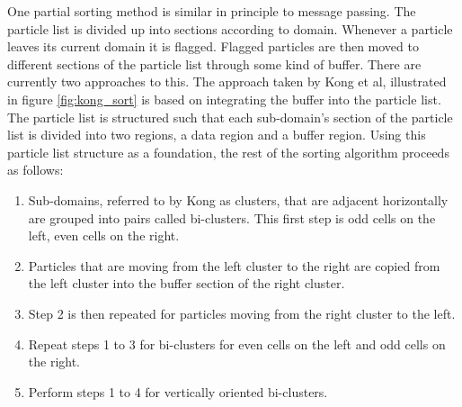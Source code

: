 	One partial sorting method is similar in principle to message passing. The particle list is divided up into sections according to domain. Whenever a particle leaves its current domain it is flagged. Flagged particles are then moved to different sections of the particle list through some kind of buffer. There are currently two approaches to this. The approach taken by Kong et al, illustrated in figure \ref{fig:kong_sort} is based on integrating the buffer into the particle list. The particle list is structured such that each sub-domain's section of the particle list is divided into two regions, a data region and a buffer region. Using this particle list structure as a foundation, the rest of the sorting algorithm proceeds as follows\cite{Kong2011}:

\begin{enumerate}
\singlespace
\item Sub-domains, referred to by Kong as clusters, that are adjacent horizontally are grouped into pairs called bi-clusters. This first step is odd cells on the left, even cells on the right. 
\item Particles that are moving from the left cluster to the right are copied from the left cluster into the buffer section of the right cluster. 
\item Step 2 is then repeated for particles moving from the right cluster to the left. 
\item Repeat steps 1 to 3 for bi-clusters for even cells on the left and odd cells on the right. 
\item Perform steps 1 to 4 for vertically oriented bi-clusters. 
\end{enumerate}


